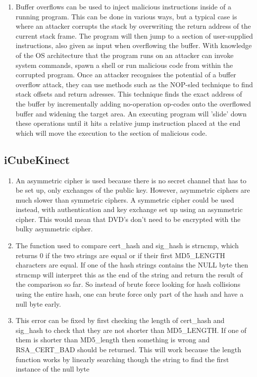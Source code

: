 \documentclass[9pt,a4paper]{article}
\begin{document}
\begin{enumerate}
\item 
Buffer overflows can be used to inject malicious instructions inside of a running program. This can be done in various ways, but a typical case is where an attacker corrupts the stack by overwriting the return address of the current stack frame. The program will then jump to a section of user-supplied instructions, also given as input when overflowing the buffer. With knowledge of the OS architecture that the program runs on an attacker can invoke system commands, spawn a shell or run malicious code from within the corrupted program. Once an attacker recognises the potential of a buffer overflow attack, they can use methods such as the NOP-sled technique to find stack offsets and return adresses. This technique finds the exact address of the buffer by incrementally adding no-operation op-codes onto the overflowed buffer and widening the target area. An executing program will 'slide' down these operations until it hits a relative jump instruction placed at the end which will move the execution to the section of malicious code.
\end{enumerate}

\subsection{iCubeKinect}
\begin{enumerate}
\item An asymmetric cipher is used because there is no secret channel that has to be set up, only exchanges of the public key. However, asymmetric ciphers are much slower than symmetric ciphers. A symmetric cipher could be used instead, with authentication and key exchange set up using an asymmetric cipher. This would mean that DVD's don't need to be encrypted with the bulky asymmetric cipher.
\item The function used to compare cert\_hash and sig\_hash is strncmp, which returns 0 if the two strings are equal or if their first MD5\_LENGTH characters are equal. If one of the hash strings contains the NULL byte then strncmp will interpret this as the end of the string and return the result of the comparison so far. So instead of brute force looking for hash collisions using the entire hash, one can brute force only part of the hash and have a null byte early.
\item This error can be fixed by first checking the length of cert\_hash and sig\_hash to check that they are not shorter than MD5\_LENGTH. If one of them is shorter than MD5\_length then something is wrong and RSA\_CERT\_BAD should be returned. This will work because the length function works by linearly searching though the string to find the first instance of the null byte
\end{enumerate}
\end{document}
